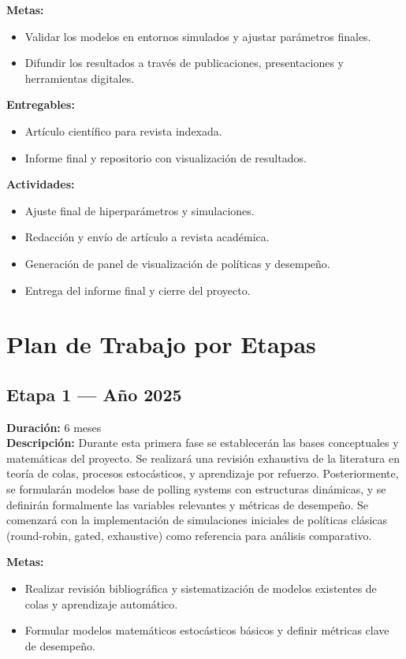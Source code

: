 \documentclass[12pt]{article}
\begin{document}
\textbf{Metas:}
\begin{itemize}
  \item Validar los modelos en entornos simulados y ajustar parámetros finales.
  \item Difundir los resultados a través de publicaciones, presentaciones y herramientas digitales.
\end{itemize}

\textbf{Entregables:}
\begin{itemize}
  \item Artículo científico para revista indexada.
  \item Informe final y repositorio con visualización de resultados.
\end{itemize}

\textbf{Actividades:}
\begin{itemize}
  \item Ajuste final de hiperparámetros y simulaciones.
  \item Redacción y envío de artículo a revista académica.
  \item Generación de panel de visualización de políticas y desempeño.
  \item Entrega del informe final y cierre del proyecto.
\end{itemize}


\section{Plan de Trabajo por Etapas}

\subsection*{Etapa 1 — Año 2025}
\textbf{Duración:} 6 meses\\
\textbf{Descripción:} Durante esta primera fase se establecerán las bases conceptuales y matemáticas del proyecto. Se realizará una revisión exhaustiva de la literatura en teoría de colas, procesos estocásticos, y aprendizaje por refuerzo. Posteriormente, se formularán modelos base de polling systems con estructuras dinámicas, y se definirán formalmente las variables relevantes y métricas de desempeño. Se comenzará con la implementación de simulaciones iniciales de políticas clásicas (round-robin, gated, exhaustive) como referencia para análisis comparativo.

\textbf{Metas:}
\begin{itemize}
  \item Realizar revisión bibliográfica y sistematización de modelos existentes de colas y aprendizaje automático.
  \item Formular modelos matemáticos estocásticos básicos y definir métricas clave de desempeño.
\end{itemize}
\end{document}
